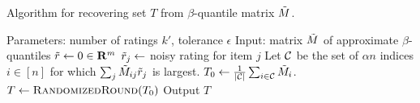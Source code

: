 \begin{algorithm}[t!]
\caption{Algorithm for recovering set $T$ from $\beta$-quantile matrix $\tilde{M}$.}
\label{alg:recover-T}
\begin{algorithmic}[1]
\State Parameters: number of ratings $k'$, tolerance $\epsilon$
\State Input: matrix $\tilde{M}$ of approximate $\beta$-quantiles
\State $\tilde{r} \gets 0 \in \mathbf{R}^m$
\State $\tilde{r}_j \gets $ noisy rating for item $j$
\EndFor
\State Let $\mathcal{C}$ be the set of $\alpha n$ indices $i \in [n]$ for which 
       $\sum_j \tilde{M}_{ij}\tilde{r}_j$ is largest.
\State $T_0 \gets \frac{1}{|\mathcal{C}|} \sum_{i \in \mathcal{C}} \tilde{M}_i$. 
\State $T \gets \textsc{RandomizedRound}(T_0)$ 
\State Output $T$
\EndIf
\EndWhile
\end{algorithmic}
\end{algorithm}
